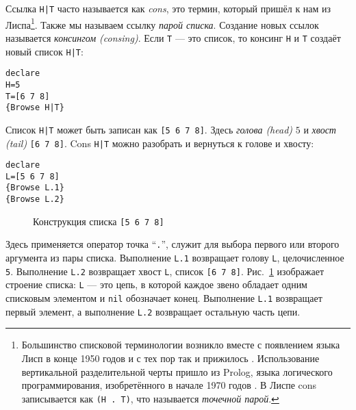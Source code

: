 Ссылка \lstinline!H|T! часто называется как \emph{cons}, это термин, который пришёл к нам из Лиспа\footnote{Большинство списковой терминологии возникло вместе с появлением языка Лисп в конце 1950 годов и с тех пор так и прижилось \cite{120}. Использование вертикальной разделительной черты пришло из Prolog, языка логического программирования, изобретённого в начале 1970 годов \cite{40, 182}. В Лиспе cons записывается как \lstinline|(H . T)|, что называется \emph{точечной парой}.}. Также мы называем ссылку \emph{парой списка}. Создание новых ссылок называется \emph{консингом (consing)}. Если \lstinline|T| --- это список, то консинг \lstinline|H| и \lstinline|T| создаёт новый список \lstinline!H|T!:



\begin{lstlisting}
declare
H=5
T=[6 7 8]
{Browse H|T}
\end{lstlisting}

Список \lstinline!H|T! может быть записан как \lstinline|[5 6 7 8]|. Здесь \emph{голова (head)} $5$ и \emph{хвост (tail)} \lstinline|[6 7 8]|. Cons \lstinline!H|T! можно разобрать и вернуться к голове и хвосту:

\begin{lstlisting}
declare
L=[5 6 7 8]
{Browse L.1}
{Browse L.2}
\end{lstlisting}

\begin{figure}[ht]
  \caption{Конструкция списка \lstinline|[5 6 7 8]|}
  \label{figure:list_construction}
\end{figure}

Здесь применяется оператор точка ``\lstinline|.|'', служит для выбора первого или второго аргумента из пары списка. Выполнение \lstinline|L.1| возвращает голову \lstinline|L|, целочисленное \lstinline|5|. Выполнение \lstinline|L.2| возвращает хвост \lstinline|L|, список \lstinline|[6 7 8]|. Рис.~\ref{figure:list_construction} изображает строение списка: \lstinline|L| --- это цепь, в которой каждое звено обладает одним списковым элементом и \lstinline|nil| обозначает конец. Выполнение \lstinline|L.1| возвращает первый элемент, а выполнение \lstinline|L.2| возвращает остальную часть цепи.

